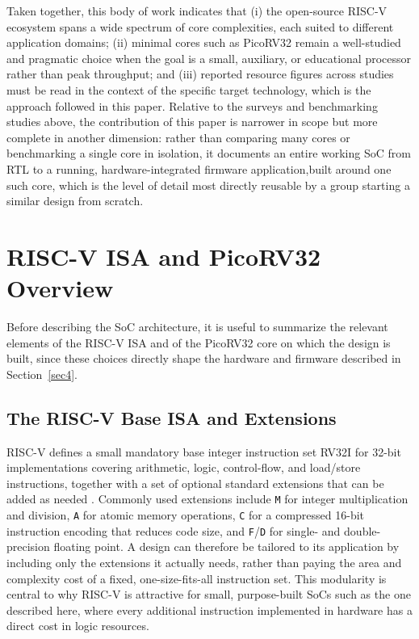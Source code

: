 \documentclass[runningheads]{llncs}
\begin{document}
Taken together, this body of work indicates that (i) the open-source RISC-V ecosystem spans a wide spectrum of core complexities, each suited to different application domains; (ii) minimal cores such as PicoRV32 remain a well-studied and pragmatic choice when the goal is a small, auxiliary, or educational processor rather than peak throughput; and (iii) reported resource figures across studies must be read in the context of the specific target technology, which is the approach followed in this paper. Relative to the surveys and benchmarking studies above, the contribution of this paper is narrower in scope but more complete in another dimension: rather than comparing many cores or benchmarking a single core in isolation, it documents an entire working SoC  from RTL to a running, hardware-integrated firmware application,built around one such core, which is the level of detail most directly reusable by a group starting a similar design from scratch.

\section{RISC-V ISA and PicoRV32 Overview}\label{sec3}

Before describing the SoC architecture, it is useful to summarize the relevant elements of the RISC-V ISA and of the PicoRV32 core on which the design is built, since these choices directly shape the hardware and firmware described in Section~\ref{sec4}.

\subsection{The RISC-V Base ISA and Extensions}
RISC-V defines a small mandatory base integer instruction set  RV32I for 32-bit implementations  covering arithmetic, logic, control-flow, and load/store instructions, together with a set of optional standard extensions that can be added as needed \cite{Waterman2014}. Commonly used extensions include \texttt{M} for integer multiplication and division, \texttt{A} for atomic memory operations, \texttt{C} for a compressed 16-bit instruction encoding that reduces code size, and \texttt{F}/\texttt{D} for single- and double-precision floating point. A design can therefore be tailored to its application by including only the extensions it actually needs, rather than paying the area and complexity cost of a fixed, one-size-fits-all instruction set. This modularity is central to why RISC-V is attractive for small, purpose-built SoCs such as the one described here, where every additional instruction implemented in hardware has a direct cost in logic resources.
\end{document}
